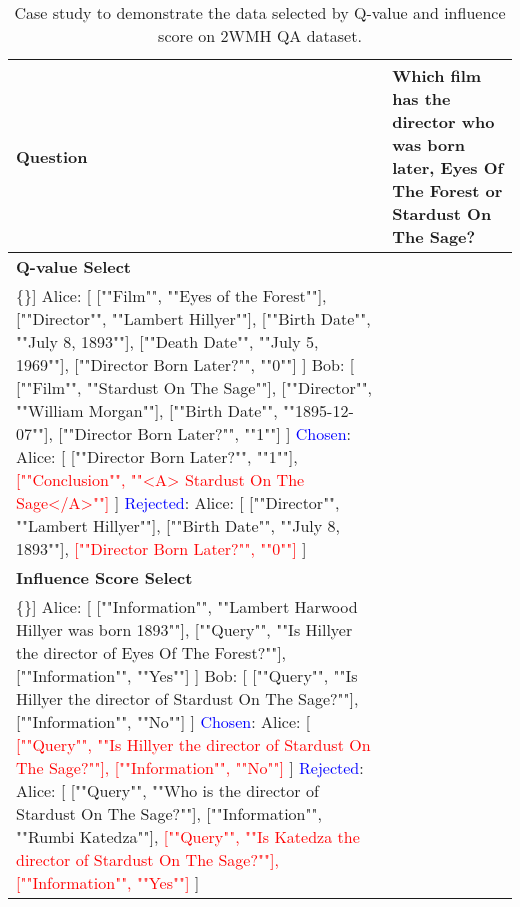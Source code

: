 \begin{table*}[t]
\caption{
Case study to demonstrate the data selected by Q-value and influence score on 2WMH QA dataset.
}
\centering
{\fontsize{8}{10}\selectfont
\begin{tabular}{|m{}|m{}|}
\toprule
    \textbf{Question} & Which film has the director who was born later, Eyes Of The Forest or Stardust On The Sage?\\
    \midrule
    \textbf{Q-value Select} & 
     \begin{Verbatim}[commandchars=\\\{\}]
Alice:
[
    [""Film"", ""Eyes of the Forest""],
    [""Director"", ""Lambert Hillyer""],
    [""Birth Date"", ""July 8, 1893""],
    [""Death Date"", ""July 5, 1969""],
    [""Director Born Later?"", ""0""]
]
Bob:
[
    [""Film"", ""Stardust On The Sage""],
    [""Director"", ""William Morgan""],
    [""Birth Date"", ""1895-12-07""],
    [""Director Born Later?"", ""1""]
]
\textcolor{blue}{Chosen}:
Alice:
[
    [""Director Born Later?"", ""1""],
    \textcolor{red}{[""Conclusion"", ""<A> Stardust On The Sage</A>""]}
]
\textcolor{blue}{Rejected}: 
Alice:
[
    [""Director"", ""Lambert Hillyer""],
    [""Birth Date"", ""July 8, 1893""],
    \textcolor{red}{[""Director Born Later?"", ""0""]}
]
     \end{Verbatim}
\\
\midrule
\textbf{Influence Score Select} &

\begin{Verbatim}[commandchars=\\\{\}]
Alice:
[
    [""Information"", ""Lambert Harwood Hillyer was born 1893""],
    [""Query"", ""Is Hillyer the director of Eyes Of The Forest?""],
    [""Information"", ""Yes""]
]
Bob:
[
    [""Query"", ""Is Hillyer the director of Stardust On The Sage?""],
    [""Information"", ""No""]
]
\textcolor{blue}{Chosen}:
Alice:
[
    \textcolor{red}{[""Query"", ""Is Hillyer the director of Stardust On The Sage?""],}
    \textcolor{red}{[""Information"", ""No""]}
]
\textcolor{blue}{Rejected}:
Alice:
[
    [""Query"", ""Who is the director of Stardust On The Sage?""],
    [""Information"", ""Rumbi Katedza""],
    \textcolor{red}{[""Query"", ""Is Katedza the director of Stardust On The Sage?""],}
    \textcolor{red}{[""Information"", ""Yes""]}
]
\end{Verbatim}

     
    \\\bottomrule
\end{tabular}
}
\label{tab:cases}
\end{table*}